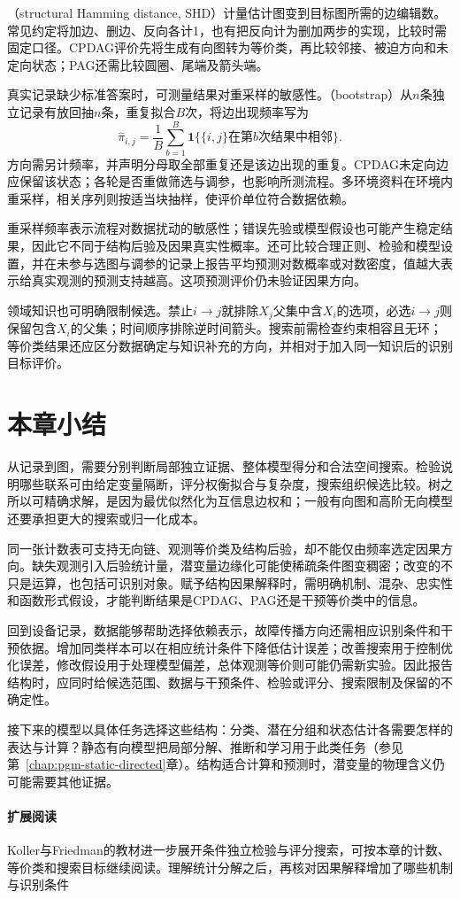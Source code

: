 （structural Hamming distance, SHD）计量估计图变到目标图所需的边编辑数。常见约定将加边、删边、反向各计1，也有把反向计为删加两步的实现，比较时需固定口径。CPDAG评价先将生成有向图转为等价类，再比较邻接、被迫方向和未定向状态；PAG还需比较圆圈、尾端及箭头端。

真实记录缺少标准答案时，可测量结果对重采样的敏感性。（bootstrap）从$n$条独立记录有放回抽$n$条，重复拟合$B$次，将边出现频率写为
\[
  \widehat\pi_{i,j}
  =\frac1B\sum_{b=1}^{B}
       \mathbf{1}\{\{i,j\}\text{在第}b\text{次结果中相邻}\}.
\]
方向需另计频率，并声明分母取全部重复还是该边出现的重复。CPDAG未定向边应保留该状态；各轮是否重做筛选与调参，也影响所测流程。多环境资料在环境内重采样，相关序列则按适当块抽样，使评价单位符合数据依赖。

重采样频率表示流程对数据扰动的敏感性；错误先验或模型假设也可能产生稳定结果，因此它不同于结构后验及因果真实性概率。还可比较合理正则、检验和模型设置，并在未参与选图与调参的记录上报告平均预测对数概率或对数密度，值越大表示给真实观测的预测支持越高。这项预测评价仍未验证因果方向。

领域知识也可明确限制候选。禁止$i\to j$就排除$X_j$父集中含$X_i$的选项，必选$i\to j$则保留包含$X_i$的父集；时间顺序排除逆时间箭头。搜索前需检查约束相容且无环；等价类结果还应区分数据确定与知识补充的方向，并相对于加入同一知识后的识别目标评价。

\section{本章小结}
\label{sec:pgm-structure-learning-summary}

从记录到图，需要分别判断局部独立证据、整体模型得分和合法空间搜索。检验说明哪些联系可由给定变量隔断，评分权衡拟合与复杂度，搜索组织候选比较。树之所以可精确求解，是因为最优似然化为互信息边权和；一般有向图和高阶无向模型还要承担更大的搜索或归一化成本。

同一张计数表可支持无向链、观测等价类及结构后验，却不能仅由频率选定因果方向。缺失观测引入后验统计量，潜变量边缘化可能使稀疏条件图变稠密；改变的不只是运算，也包括可识别对象。赋予结构因果解释时，需明确机制、混杂、忠实性和函数形式假设，才能判断结果是CPDAG、PAG还是干预等价类中的信息。

回到设备记录，数据能够帮助选择依赖表示，故障传播方向还需相应识别条件和干预依据。增加同类样本可以在相应统计条件下降低估计误差；改善搜索用于控制优化误差，修改假设用于处理模型偏差，总体观测等价则可能仍需新实验。因此报告结构时，应同时给候选范围、数据与干预条件、检验或评分、搜索限制及保留的不确定性。

接下来的模型以具体任务选择这些结构：分类、潜在分组和状态估计各需要怎样的表达与计算？静态有向模型把局部分解、推断和学习用于此类任务（参见第~\ref{chap:pgm-static-directed}章）。结构适合计算和预测时，潜变量的物理含义仍可能需要其他证据。

\paragraph{扩展阅读}
Koller与Friedman的教材进一步展开条件独立检验与评分搜索，可按本章的计数、等价类和搜索目标继续阅读。理解统计分解之后，再核对因果解释增加了哪些机制与识别条件
